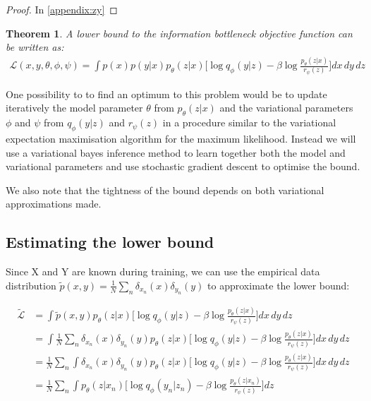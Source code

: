 \documentclass[11pt,oneside,openright]{report}
\newtheorem{theorem}{Theorem}
\begin{document}
\begin{proof} In \ref{appendix:zy}\end{proof}

\begin{theorem}
A lower bound to the information bottleneck objective function can be written as:
 \begin{align}
\mathcal{L}(x, y, \theta, \phi, \psi) = \int p(x) p(y|x) p_\theta(z|x) \Big[ \log q_\phi(y|z) - \beta  \log \frac{p_\theta(z|x)}{r_\psi(z)}\Big] dx\, dy\, dz
\end{align}
\end{theorem}

One possibility to to find an optimum to this problem would be to update iteratively the model parameter $\theta$ from $p_\theta(z|x)$  and the variational parameters $\phi$ and $\psi$ from $q_\phi(y|z)$ and $r_\psi(z)$ in a procedure similar to the variational expectation maximisation algorithm \cite{vem} for the maximum likelihood. Instead we will use a variational bayes inference method to learn together both the model and variational parameters and use stochastic gradient descent to optimise the bound.

We also note that the tightness of the bound depends on both variational approximations made.

\subsection{Estimating the lower bound}
Since X and Y are known during training, we can use the empirical data distribution $\tilde{p}(x, y) = \frac{1}{N}\sum_n\delta_{x_n}(x)\delta_{y_n}(y)$ to approximate the lower bound:

 \begin{align}
\tilde{\mathcal{L}} & = \int \tilde{p}(x, y) p_\theta(z|x) \Big[\log q_\phi(y|z) - \beta \log \frac{p_\theta(z|x)}{r_\psi(z)} \Big]dx\, dy\, dz  \\
   & = \int \frac{1}{N}\sum_n\delta_{x_n}(x)\delta_{y_n}(y) p_\theta(z|x) \Big[\log q_\phi(y|z) - \beta \log \frac{p_\theta(z|x)}{r_\psi(z)} \Big] dx\, dy\, dz \\
   & = \frac{1}{N}\sum_n \int \delta_{x_n}(x)\delta_{y_n}(y) p_\theta(z|x) \Big[ \log q_\phi(y|z) - \beta \log \frac{p_\theta(z|x)}{r_\psi(z)}\Big ] dx\, dy\, dz \\
   & = \frac{1}{N}\sum_n \int p_\theta(z|x_n) \Big[  \log q_\phi(y_n|z_n) - \beta   \log \frac{p_\theta(z|x_n)}{r_\psi(z)} \Big] dz \label{eq:lower}
\end{align}
\end{document}

